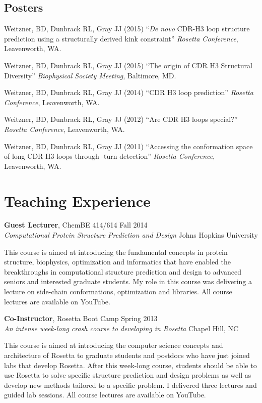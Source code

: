 \documentclass[12pt]{article}
\newcommand{\allcapsspacing}[1]{{\addfontfeature{LetterSpace=7.5}#1}}
\newcommand{\tworowstwocolsitem}[4]{
{#1} \hfill {#2} \\
{#3} \hfill {#4} \\
\vspace{-0.5\baselineskip}\par}
\newcommand{\teachingitem}[4]{
\tworowstwocolsitem{#1}{#2}{\textit{#3}}{#4}}
\begin{document}
\subsection*{\allcapsspacing{Posters}}
\begin{etaremune}
\item Weitzner, BD, Dunbrack RL, Gray JJ (2015) ``\textit{De novo} CDR-H3 loop structure prediction using a structurally derived kink constraint'' \textit{Rosetta Conference}, Leavenworth, WA.
\item Weitzner, BD, Dunbrack RL, Gray JJ (2015) ``The origin of CDR H3 Structural Diversity'' \textit{Biophysical Society Meeting}, Baltimore, MD.
\item Weitzner, BD, Dunbrack RL, Gray JJ (2014) ``CDR H3 loop prediction'' \textit{Rosetta Conference}, Leavenworth, WA.
\item Weitzner, BD, Dunbrack RL, Gray JJ (2012) ``Are CDR H3 loops special?'' \textit{Rosetta Conference}, Leavenworth, WA.
\item Weitzner, BD, Dunbrack RL, Gray JJ (2011) ``Accessing the conformation space of long CDR H3 loops through \textbeta-turn detection'' \textit{Rosetta Conference}, Leavenworth, WA.
\end{etaremune}

\section*{\allcapsspacing{Teaching Experience}}
\teachingitem{\textbf{Guest Lecturer}, ChemBE 414/614}{Fall 2014}{Computational Protein Structure Prediction and Design}{Johns Hopkins University}
This course is aimed at introducing the fundamental concepts in protein structure, biophysics, optimization and informatics that have enabled the breakthroughs in computational structure prediction and design to advanced seniors and interested graduate students.
My role in this course was delivering a lecture on side-chain conformations, optimization and libraries.
All course lectures are available on YouTube.\par\vspace{\baselineskip}

\teachingitem{\textbf{Co-Instructor}, Rosetta Boot Camp}{Spring 2013}{An intense week-long crash course to developing in Rosetta}{Chapel Hill, NC}
This course is aimed at introducing the computer science concepts and architecture of Rosetta to graduate students and postdocs who have just joined labs that develop Rosetta.
After this week-long course, students should be able to use Rosetta to solve specific structure prediction and design problems as well as develop new methods tailored to a specific problem.
I delivered three lectures and guided lab sessions.
All course lectures are available on YouTube.\par\vspace{\baselineskip}
\end{document}
